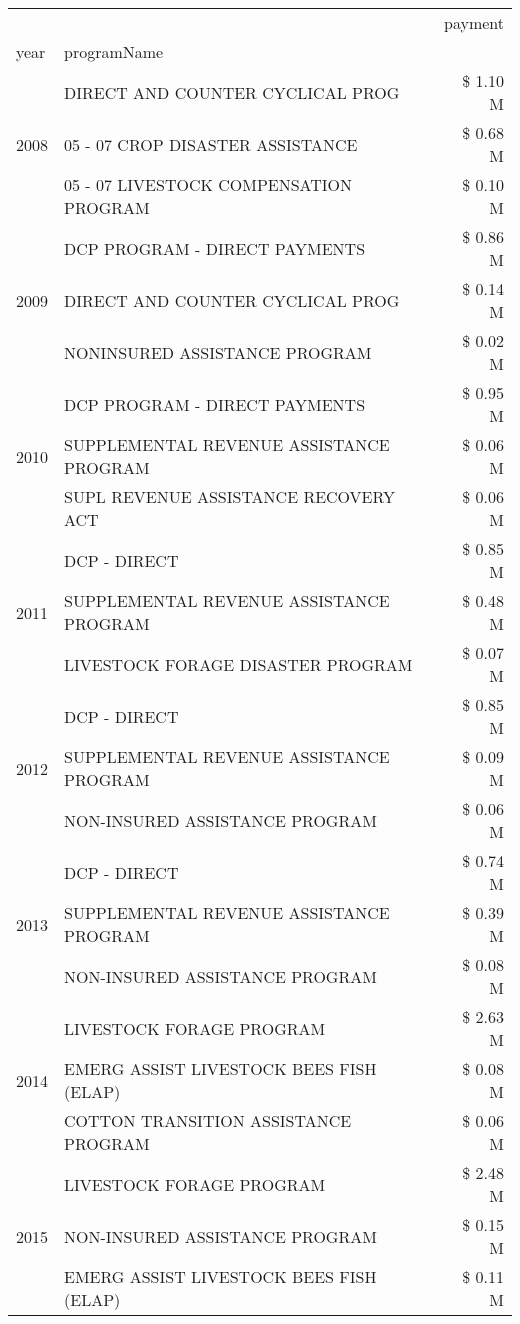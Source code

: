 \begin{tabular}{llr}
\toprule
 &  & payment \\
year & programName &  \\
\midrule
\multirow[t]{3}{*}{2008} & DIRECT AND COUNTER CYCLICAL PROG & \$ 1.10 M \\
 & 05 - 07 CROP DISASTER ASSISTANCE & \$ 0.68 M \\
 & 05 - 07 LIVESTOCK COMPENSATION PROGRAM & \$ 0.10 M \\
\cline{1-3}
\multirow[t]{3}{*}{2009} & DCP PROGRAM - DIRECT PAYMENTS & \$ 0.86 M \\
 & DIRECT AND COUNTER CYCLICAL PROG & \$ 0.14 M \\
 & NONINSURED ASSISTANCE PROGRAM & \$ 0.02 M \\
\cline{1-3}
\multirow[t]{3}{*}{2010} & DCP PROGRAM - DIRECT PAYMENTS & \$ 0.95 M \\
 & SUPPLEMENTAL REVENUE ASSISTANCE PROGRAM & \$ 0.06 M \\
 & SUPL REVENUE ASSISTANCE RECOVERY ACT & \$ 0.06 M \\
\cline{1-3}
\multirow[t]{3}{*}{2011} & DCP - DIRECT & \$ 0.85 M \\
 & SUPPLEMENTAL REVENUE ASSISTANCE PROGRAM & \$ 0.48 M \\
 & LIVESTOCK FORAGE DISASTER PROGRAM & \$ 0.07 M \\
\cline{1-3}
\multirow[t]{3}{*}{2012} & DCP - DIRECT & \$ 0.85 M \\
 & SUPPLEMENTAL REVENUE ASSISTANCE PROGRAM & \$ 0.09 M \\
 & NON-INSURED ASSISTANCE PROGRAM & \$ 0.06 M \\
\cline{1-3}
\multirow[t]{3}{*}{2013} & DCP - DIRECT & \$ 0.74 M \\
 & SUPPLEMENTAL REVENUE ASSISTANCE PROGRAM & \$ 0.39 M \\
 & NON-INSURED ASSISTANCE PROGRAM & \$ 0.08 M \\
\cline{1-3}
\multirow[t]{3}{*}{2014} & LIVESTOCK FORAGE PROGRAM & \$ 2.63 M \\
 & EMERG ASSIST LIVESTOCK BEES FISH (ELAP) & \$ 0.08 M \\
 & COTTON TRANSITION ASSISTANCE PROGRAM & \$ 0.06 M \\
\cline{1-3}
\multirow[t]{3}{*}{2015} & LIVESTOCK FORAGE PROGRAM & \$ 2.48 M \\
 & NON-INSURED ASSISTANCE PROGRAM & \$ 0.15 M \\
 & EMERG ASSIST LIVESTOCK BEES FISH (ELAP) & \$ 0.11 M \\

\end{tabular}
